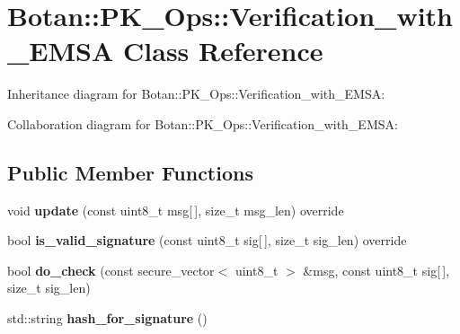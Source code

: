 \hypertarget{class_botan_1_1_p_k___ops_1_1_verification__with___e_m_s_a}{}\section{Botan\+:\+:P\+K\+\_\+\+Ops\+:\+:Verification\+\_\+with\+\_\+\+E\+M\+SA Class Reference}
\label{class_botan_1_1_p_k___ops_1_1_verification__with___e_m_s_a}


Inheritance diagram for Botan\+:\+:P\+K\+\_\+\+Ops\+:\+:Verification\+\_\+with\+\_\+\+E\+M\+SA\+:


Collaboration diagram for Botan\+:\+:P\+K\+\_\+\+Ops\+:\+:Verification\+\_\+with\+\_\+\+E\+M\+SA\+:
\subsection*{Public Member Functions}
\begin{DoxyCompactItemize}
\item 
\mbox{\label{class_botan_1_1_p_k___ops_1_1_verification__with___e_m_s_a_a1c6ff258916dd85be2264307518d6832}} 
void {\bfseries update} (const uint8\+\_\+t msg\mbox{[}$\,$\mbox{]}, size\+\_\+t msg\+\_\+len) override
\item 
\mbox{\label{class_botan_1_1_p_k___ops_1_1_verification__with___e_m_s_a_a82ffec0802eed5e5ca83ea751037b11a}} 
bool {\bfseries is\+\_\+valid\+\_\+signature} (const uint8\+\_\+t sig\mbox{[}$\,$\mbox{]}, size\+\_\+t sig\+\_\+len) override
\item 
\mbox{\label{class_botan_1_1_p_k___ops_1_1_verification__with___e_m_s_a_ae4e645ce9a72d7520964686dcadc9ef4}} 
bool {\bfseries do\+\_\+check} (const secure\+\_\+vector$<$ uint8\+\_\+t $>$ \&msg, const uint8\+\_\+t sig\mbox{[}$\,$\mbox{]}, size\+\_\+t sig\+\_\+len)
\item 
\mbox{\label{class_botan_1_1_p_k___ops_1_1_verification__with___e_m_s_a_a48acf2ed32eaed844d3c7388c2cc8bcb}} 
std\+::string {\bfseries hash\+\_\+for\+\_\+signature} ()
\end{DoxyCompactItemize}
